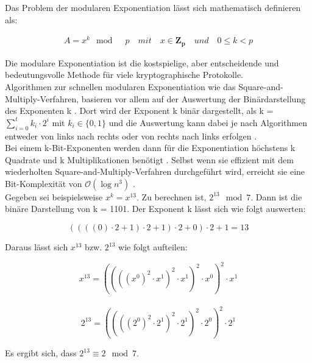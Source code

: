 Das Problem der modularen Exponentiation lässt sich mathematisch definieren als:
\begin{ceqn}

\begin{align*}
   A = x^k \mod \quad p \quad mit \quad x \in \mathbf{Z_p} \quad und \quad 0 \leq k < p
\end{align*}

\end{ceqn}

Die modulare Exponentiation ist die kostspielige, aber
entscheidende und bedeutungsvolle Methode für viele kryptographische Protokolle. \\

Algorithmen zur schnellen modularen Exponentiation wie das Square-and-Multiply-Verfahren, basieren vor
allem auf der Auswertung der Binärdarstellung des Exponenten k \cite{langMEI}. 
Dort wird der Exponent k binär dargestellt, als k = \(\sum_{i=0}^{t} k_i \cdot 2^i\) mit $ k_i \in \{0, 1\}$ und die Auswertung kann dabei je nach Algorithmen entweder von links nach rechts oder von rechts nach links erfolgen \cite{langMEI}. \\

Bei einem k-Bit-Exponenten werden dann für die Exponentiation höchstens k Quadrate und k Multiplikationen benötigt \cite{langMEI}.
Selbst wenn sie effizient mit dem wiederholten Square-and-Multiply-Verfahren durchgeführt wird, erreicht sie eine Bit-Komplexität von $\mathcal{O}(\log{}n^3)$ \cite{menezes:1997}.  \\

Gegeben sei beispielsweise \(x^k = x^{13}\). Zu berechnen ist, \( 2^{13} \mod 7\).
Dann ist die binäre Darstellung von k = 1101. Der Exponent k lässt sich wie folgt auswerten: \\
\begin{ceqn}
  \[((((0) \cdot 2 + 1) \cdot 2 + 1) \cdot 2 + 0) \cdot 2 + 1   =   13 \]
\end{ceqn}

Daraus lässt sich $ x^{13} $ bzw. $ 2^{13}$ wie folgt aufteilen: \\
\begin{ceqn}
   \[ x^{13} = ((((x^0)^2 \cdot x^1)^2 \cdot x^1)^2 \cdot x^0)^2 \cdot x^1 \] \\
   \[ 2^{13} = ((((2^0)^2 \cdot 2^1)^2 \cdot 2^1)^2 \cdot 2^0)^2 \cdot 2^1 \] 
\end{ceqn}

Es ergibt sich, dass \( 2^{13} \equiv 2 \mod 7\).\\

